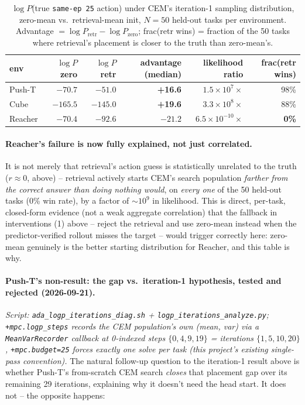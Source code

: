 \documentclass[11pt]{article}
\begin{document}
\begin{table}[H]
\centering\small
\caption{$\log P$(true \texttt{same-ep 25} action) under CEM's iteration-1 sampling
distribution, zero-mean vs.\ retrieval-mean init, $N=50$ held-out tasks per environment.
Advantage $=\log P_{\mathrm{retr}} - \log P_{\mathrm{zero}}$; frac(retr wins) = fraction of the
50 tasks where retrieval's placement is closer to the truth than zero-mean's.}
\label{tab:retrieval-logp}
\begin{tabular}{lrrrrr}
\toprule
env & $\log P$ zero & $\log P$ retr & advantage (median) & likelihood ratio & frac(retr wins) \\
\midrule
Push-T  & $-70.7$  & $-51.0$  & \textbf{+16.6} & $1.5\times10^{7}\times$  & 98\% \\
Cube    & $-165.5$ & $-145.0$ & \textbf{+19.6} & $3.3\times10^{8}\times$  & 88\% \\
Reacher & $-70.4$  & $-92.6$  & $-21.2$        & $6.5\times10^{-10}\times$ & \textbf{0\%} \\
\bottomrule
\end{tabular}
\end{table}

\paragraph{Reacher's failure is now fully explained, not just correlated.} It is not merely
that retrieval's action guess is statistically unrelated to the truth ($r\approx0$, above) --
retrieval actively starts CEM's search population \emph{farther from the correct answer than
doing nothing would}, on \emph{every one} of the 50 held-out tasks (0\% win rate), by a factor
of $\sim 10^9$ in likelihood. This is direct, per-task, closed-form evidence (not a weak
aggregate correlation) that the fallback in interventions (1) above -- reject the retrieval and
use zero-mean instead when the predictor-verified rollout misses the target -- would trigger
correctly here: zero-mean genuinely is the better starting distribution for Reacher, and this
table is why.

\paragraph{Push-T's non-result: the gap vs.\ iteration-1 hypothesis, tested and rejected
(2026-09-21).} \emph{Script: \texttt{ada\_logp\_iterations\_diag.sh} +
\texttt{logp\_iterations\_analyze.py}; \texttt{+mpc.logp\_steps} records the CEM population's
own (mean, var) via a \texttt{MeanVarRecorder} callback at 0-indexed steps
$\{0,4,9,19\}$ = iterations $\{1,5,10,20\}$, \texttt{+mpc.budget=25} forces exactly one solve
per task (this project's existing single-pass convention).} The natural follow-up question to
the iteration-1 result above is whether Push-T's from-scratch CEM search \emph{closes} that
placement gap over its remaining 29 iterations, explaining why it doesn't need the head start.
It does not -- the opposite happens:
\end{document}
